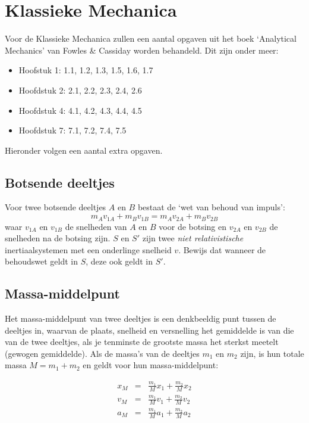 \section{Klassieke Mechanica}
Voor de Klassieke Mechanica zullen een aantal opgaven uit het boek
`Analytical Mechanics' van Fowles \& Cassiday worden behandeld. Dit zijn onder meer:
\begin{itemize}
\item{Hoofstuk 1}: 1.1, 1.2, 1.3, 1.5, 1.6, 1.7
\item{Hoofdstuk 2}: 2.1, 2.2, 2.3, 2.4, 2.6
\item{Hoofdstuk 4}: 4.1, 4.2, 4.3, 4.4, 4.5
\item{Hoofdstuk 7}: 7.1, 7.2, 7.4, 7.5
\end{itemize}
Hieronder volgen een aantal extra opgaven.

\subsection{Botsende deeltjes}
Voor twee botsende deeltjes $A$ en $B$ bestaat de `wet van behoud van impuls':
\begin{displaymath}
   m_{A}v_{1A} + m_{B}v_{1B} = m_{A}v_{2A} + m_{B}v_{2B}
\end{displaymath}
waar $v_{1A}$ en $v_{1B}$ de snelheden van $A$ en $B$ voor de botsing 
en $v_{2A}$ en $v_{2B}$ de snelheden na de botsing zijn.
$S$ en $S'$ zijn twee \textit{niet relativistische} inertiaalsystemen met een onderlinge snelheid $v$.
Bewijs dat wanneer de behoudswet geldt in $S$, deze ook geldt in $S'$.

\subsection{Massa-middelpunt}
Het  massa-middelpunt van twee deeltjes is een denkbeeldig punt tussen de 
deeltjes in, waarvan de  plaats,  snelheid  en  versnelling  het  gemiddelde 
is van die van de twee deeltjes, als je tenminste  de  grootste  massa  het  
sterkst  meetelt (gewogen gemiddelde).  
Als de massa's van de deeltjes $m_{1}$ en $m_{2}$ zijn, is hun totale
massa $M =  m_{1} + m_{2}$ en geldt voor hun massa-middelpunt:

\begin{eqnarray*}
   x_{M} & = &  \frac{m_{1}}{M}x_{1} + \frac{m_{2}}{M}x_{2} \\
   v_{M} & = &  \frac{m_{1}}{M}v_{1} + \frac{m_{2}}{M}v_{2} \\
   a_{M} & = &  \frac{m_{1}}{M}a_{1} + \frac{m_{2}}{M}a_{2} 
\end{eqnarray*}

